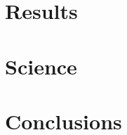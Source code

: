 \documentclass[twocolumn,numberedappendix]{emulateapj}
\begin{document}



\section{Results}

\section{Science}

\section{Conclusions}




\end{document}
